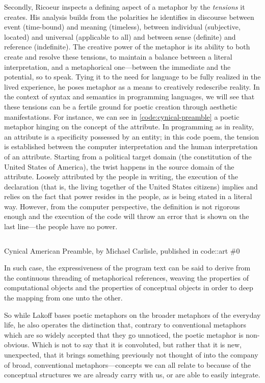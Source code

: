 Secondly, Ricoeur inspects a defining aspect of a metaphor by the \emph{tensions} it creates. His analysis builds from the polarities he identifies in discourse between event (time-bound) and meaning (timeless), between individual (subjective, located) and universal (applicable to all) and between sense (definite) and reference (indefinite). The creative power of the metaphor is its ability to both create and resolve these tensions, to maintain a balance between a literal interpretation, and a metaphorical one—between the immediate and the potential, so to speak. Tying it to the need for language to be fully realized in the lived experience, he poses metaphor as a means to creatively redescribe reality. In the context of syntax and semantics in programming languages, we will see that these tensions can be a fertile ground for poetic creation through aesthetic manifestations. For instance, we can see in \ref{code:cynical-preamble} a poetic metaphor hinging on the concept of the attribute. In programming as in reality, an attribute is a specificity possessed by an entity; in this code poem, the tension is established between the computer interpretation and the human interpretation of an attribute. Starting from a political target domain (the constitution of the United States of America), the twist happens in the source domain of the attribute. Loosely attributed by the people in writing, the execution of the declaration (that is, the living together of the United States citizens) implies and relies on the fact that power resides in the people, as is being stated in a literal way. However, from the computer perspective, the definition is not rigorous enough and the execution of the code will throw an error that is shown on the last line—the people have no power.

\begin{listing}
    \inputminted[]{python}{./corpus/cynical_american_preamble.py}
    \caption{Cynical American Preamble, by Michael Carlisle, published in code::art \#0 \citep{brand_code_2019}}
    \label{code:cynical-preamble}
\end{listing}

In such case, the expressiveness of the program text can be said to derive from the continuous threading of metaphorical references, weaving the properties of computational objects and the properties of conceptual objects in order to deep the mapping from one unto the other.

So while Lakoff bases poetic metaphors on the broader metaphors of the everyday life, he also operates the distinction that, contrary to conventional metaphors which are so widely accepted that they go unnoticed, the poetic metaphor is non-obvious. Which is not to say that it is convoluted, but rather that it is new, unexpected, that it brings something previously not thought of into the company of broad, conventional metaphors—concepts we can all relate to because of the conceptual structures we are already carry with us, or are able to easily integrate.


